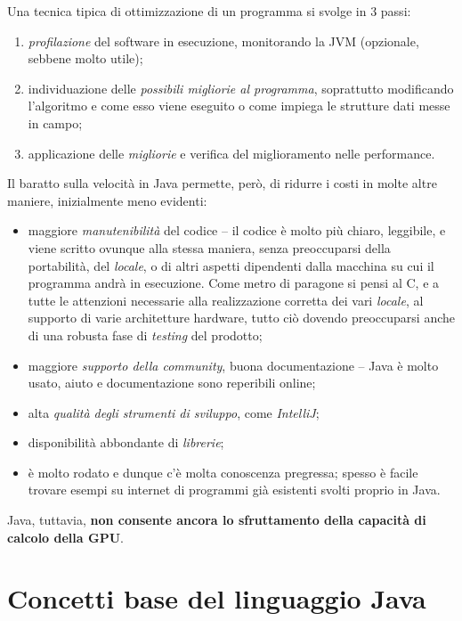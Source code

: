 \documentclass[\fontsizeclass,twocolumn]{\classname}
\theoremstyle{definition}
\theoremstyle{definition}
\begin{document}
Una tecnica tipica di ottimizzazione di un programma si svolge in $3$ passi:
\begin{enumerate}
	\item \emph{profilazione} del software in esecuzione, monitorando la JVM
		(opzionale, sebbene molto utile);
    \item individuazione delle \emph{possibili migliorie al programma},
        soprattutto modificando l'algoritmo e come esso viene eseguito o come
        impiega le strutture dati messe in campo;
    \item applicazione delle \emph{migliorie} e verifica del miglioramento
        nelle performance.
\end{enumerate}

Il baratto sulla velocità in Java permette, però, di ridurre i costi in molte
altre maniere, inizialmente meno evidenti:

\begin{itemize}
	\item maggiore \emph{manutenibilità} del codice \--- il codice è molto più
	chiaro, leggibile, e viene scritto ovunque alla stessa maniera, senza
    preoccuparsi della portabilità, del \emph{locale}, o di altri aspetti dipendenti
    dalla macchina su cui il programma andrà in esecuzione. Come metro di
    paragone si pensi al C, e a tutte le attenzioni necessarie alla
    realizzazione corretta dei vari \emph{locale}, al supporto di varie
    architetture hardware, tutto ciò dovendo preoccuparsi anche di una robusta
    fase di \emph{testing} del prodotto;
    \item maggiore \emph{supporto della community}, buona documentazione \---
        Java è molto usato, aiuto e documentazione sono reperibili online;
    \item alta \emph{qualità degli strumenti di sviluppo}, come \emph{IntelliJ};
	\item disponibilità abbondante di \emph{librerie};
	\item è molto rodato e dunque c'è molta conoscenza pregressa; spesso è
	facile trovare esempi su internet di programmi già esistenti svolti proprio
	in Java.
\end{itemize}

Java, tuttavia, \textbf{non consente ancora lo sfruttamento della capacità di
calcolo della GPU}.

\chapter{Concetti base del linguaggio Java}
\end{document}
